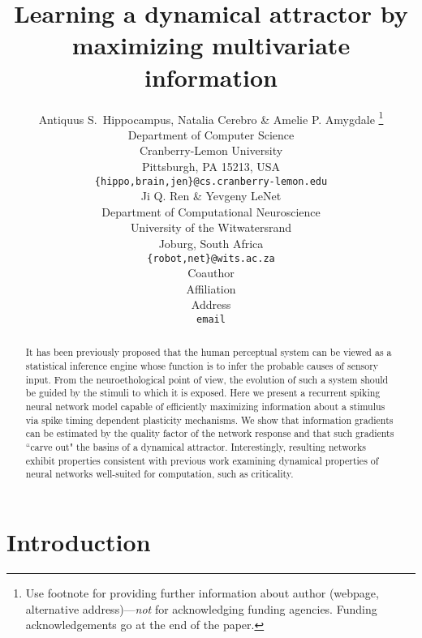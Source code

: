 \documentclass{article} %
\title{Learning a dynamical attractor by maximizing multivariate information}
\author{Antiquus S.~Hippocampus, Natalia Cerebro \& Amelie P. Amygdale \thanks{ Use footnote for providing further information
about author (webpage, alternative address)---\emph{not} for acknowledging
funding agencies.  Funding acknowledgements go at the end of the paper.} \\
Department of Computer Science\\
Cranberry-Lemon University\\
Pittsburgh, PA 15213, USA \\
\texttt{\{hippo,brain,jen\}@cs.cranberry-lemon.edu} \\
\And
Ji Q. Ren \& Yevgeny LeNet \\
Department of Computational Neuroscience \\
University of the Witwatersrand \\
Joburg, South Africa \\
\texttt{\{robot,net\}@wits.ac.za} \\
\AND
Coauthor \\
Affiliation \\
Address \\
\texttt{email}
}
\begin{document}
\maketitle

\begin{abstract}
It has been previously proposed that the human perceptual system can be viewed as a statistical inference engine whose function is to infer the probable causes of sensory input. From the neuroethological point of view, the evolution of such a system should be guided by the stimuli to which it is exposed. Here we present a recurrent spiking neural network model capable of efficiently maximizing information about a stimulus via spike timing dependent plasticity mechanisms. We show that information gradients can be estimated by the quality factor of the network response and that such gradients ``carve out" the basins of a dynamical attractor. Interestingly, resulting networks exhibit properties consistent with previous work examining dynamical properties of neural networks well-suited for computation, such as criticality.
\end{abstract}


\section{Introduction}
\end{document}
